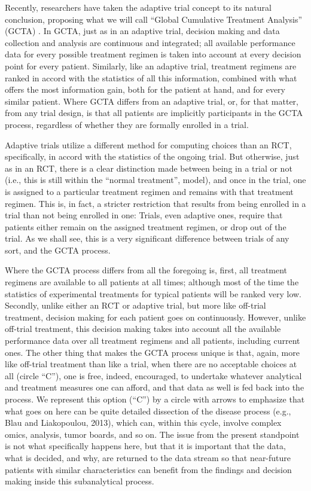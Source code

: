 \documentclass[12pt]{article}
\begin{document}
Recently, researchers have taken the adaptive trial concept to its
natural conclusion, proposing what we will call “Global Cumulative
Treatment Analysis” (GCTA) \cite{VickersandScardino2009, Huber2013,
  ShragerandTenenbaum2011, TenenbaumandShrager2011}. In GCTA, just as
in an adaptive trial, decision making and data collection and analysis
are continuous and integrated; all available performance data for
every possible treatment regimen is taken into account at every
decision point for every patient. Similarly, like an adaptive trial,
treatment regimens are ranked in accord with the statistics of all
this information, combined with what offers the most information gain,
both for the patient at hand, and for every similar patient. Where
GCTA differs from an adaptive trial, or, for that matter, from any
trial design, is that all patients are implicitly participants in the
GCTA process, regardless of whether they are formally enrolled in a
trial.

Adaptive trials utilize a different method for computing choices than
an RCT, specifically, in accord with the statistics of the ongoing
trial. But otherwise, just as in an RCT, there is a clear distinction
made between being in a trial or not (i.e., this is still within the
“normal treatment”, model), and once in the trial, one is assigned to
a particular treatment regimen and remains with that treatment
regimen. This is, in fact, a stricter restriction that results from
being enrolled in a trial than not being enrolled in one: Trials, even
adaptive ones, require that patients either remain on the assigned
treatment regimen, or drop out of the trial. As we shall see, this is
a very significant difference between trials of any sort, and the GCTA
process.

Where the GCTA process differs from all the foregoing is, first, all
treatment regimens are available to all patients at all times;
although most of the time the statistics of experimental treatments
for typical patients will be ranked very low. Secondly, unlike either
an RCT or adaptive trial, but more like off-trial treatment, decision
making for each patient goes on continuously.  However, unlike
off-trial treatment, this decision making takes into account all the
available performance data over all treatment regimens and all
patients, including current ones. The other thing that makes the GCTA
process unique is that, again, more like off-trial treatment than like
a trial, when there are no acceptable choices at all (circle “C”), one
is free, indeed, encouraged, to undertake whatever analytical and
treatment measures one can afford, and that data as well is fed back
into the process. We represent this option (“C”) by a circle with
arrows to emphasize that what goes on here can be quite detailed
dissection of the disease process (e.g., Blau and Liakopoulou, 2013),
which can, within this cycle, involve complex omics, analysis, tumor
boards, and so on. The issue from the present standpoint is not what
specifically happens here, but that it is important that the data,
what is decided, and why, are returned to the data stream so that
near-future patients with similar characteristics can benefit from the
findings and decision making inside this subanalytical process.
\end{document}
